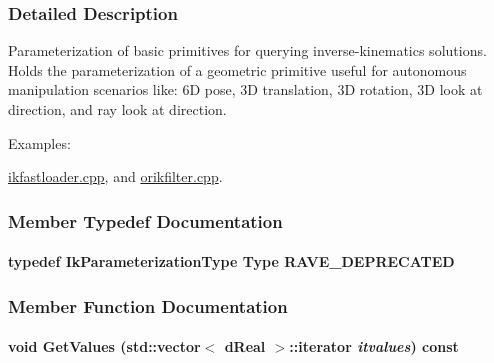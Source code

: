 \subsubsection{Detailed Description}
Parameterization of basic primitives for querying inverse-\/kinematics solutions. Holds the parameterization of a geometric primitive useful for autonomous manipulation scenarios like: 6D pose, 3D translation, 3D rotation, 3D look at direction, and ray look at direction. \begin{Desc}
\item[Examples: ]\par


\hyperlink{ikfastloader_8cpp-example}{ikfastloader.cpp}, and \hyperlink{orikfilter_8cpp-example}{orikfilter.cpp}.

\end{Desc}


\subsubsection{Member Typedef Documentation}
\hypertarget{classOpenRAVE_1_1IkParameterization_a63fa0d3744e7eebf98b264ad1242bfad}{
\paragraph[{RAVE\_\-DEPRECATED}]{\setlength{\rightskip}{0pt plus 5cm}typedef {\bf IkParameterizationType} Type {\bf RAVE\_\-DEPRECATED}}\hfill}
\label{classOpenRAVE_1_1IkParameterization_a63fa0d3744e7eebf98b264ad1242bfad}


\subsubsection{Member Function Documentation}
\hypertarget{classOpenRAVE_1_1IkParameterization_ab349673fdd07cae6247793bb3961f7e4}{
\paragraph[{GetValues}]{\setlength{\rightskip}{0pt plus 5cm}void GetValues (std::vector$<$ dReal $>$::iterator {\em itvalues}) const}\hfill}
\label{classOpenRAVE_1_1IkParameterization_ab349673fdd07cae6247793bb3961f7e4}


